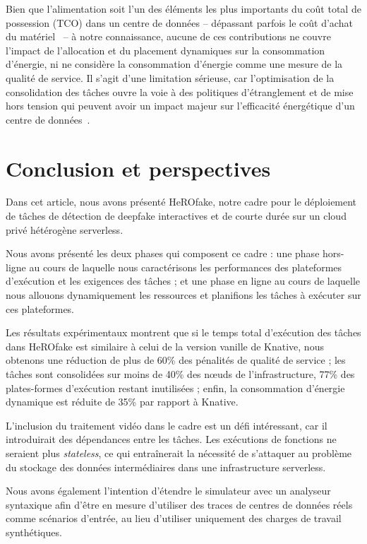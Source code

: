 Bien que l'alimentation soit l'un des éléments les plus importants du coût total de possession (TCO) dans un centre de données -- dépassant parfois le coût d'achat du matériel~\cite{7279063} -- à notre connaissance, aucune de ces contributions ne couvre l'impact de l'allocation et du placement dynamiques sur la consommation d'énergie, ni ne considère la consommation d'énergie comme une mesure de la qualité de service. Il s'agit d'une limitation sérieuse, car l'optimisation de la consolidation des tâches ouvre la voie à des politiques d'étranglement et de mise hors tension qui peuvent avoir un impact majeur sur l'efficacité énergétique d'un centre de données~\cite{chaurasiaComprehensiveSurveyEnergyaware2021}.

\section{Conclusion et perspectives}
\label{section:herofake-conclusion}

Dans cet article, nous avons présenté HeROfake, notre cadre pour le déploiement de tâches de détection de deepfake interactives et de courte durée sur un cloud privé hétérogène serverless.

Nous avons présenté les deux phases qui composent ce cadre : une phase hors-ligne au cours de laquelle nous caractérisons les performances des plateformes d'exécution et les exigences des tâches ; et une phase en ligne au cours de laquelle nous allouons dynamiquement les ressources et planifions les tâches à exécuter sur ces plateformes.

Les résultats expérimentaux montrent que si le temps total d'exécution des tâches dans HeROfake est similaire à celui de la version vanille de Knative, nous obtenons une réduction de plus de 60\% des pénalités de qualité de service ; les tâches sont consolidées sur moins de 40\% des nœuds de l'infrastructure, 77\% des plates-formes d'exécution restant inutilisées ; enfin, la consommation d'énergie dynamique est réduite de 35\% par rapport à Knative.

L'inclusion du traitement vidéo dans le cadre est un défi intéressant, car il introduirait des dépendances entre les tâches. Les exécutions de fonctions ne seraient plus \textit{stateless}, ce qui entraînerait la nécessité de s'attaquer au problème du stockage des données intermédiaires dans une infrastructure serverless.

Nous avons également l'intention d'étendre le simulateur avec un analyseur syntaxique afin d'être en mesure d'utiliser des traces de centres de données réels comme scénarios d'entrée, au lieu d'utiliser uniquement des charges de travail synthétiques.
